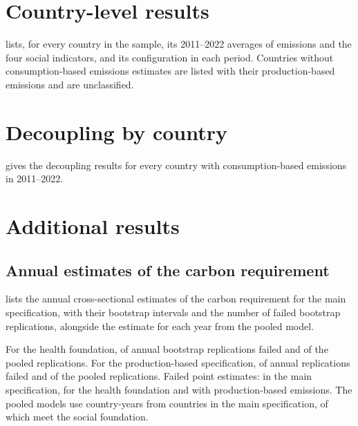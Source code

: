 \section{Country-level results}\label{app:countries}

 lists, for every country in the sample, its 2011--2022 averages of emissions and the four social indicators, and its configuration in each period. Countries without consumption-based emissions estimates are listed with their production-based emissions and are unclassified.



\section{Decoupling by country}\label{app:decoupling}

 gives the decoupling results for every country with consumption-based emissions in 2011--2022.



\section{Additional results}\label{app:extra}

\subsection{Annual estimates of the carbon requirement}

 lists the annual cross-sectional estimates of the carbon requirement for the main specification, with their bootstrap intervals and the number of failed bootstrap replications, alongside the estimate for each year from the pooled model.



For the health foundation, \nReqBootFailHealth{} of \nReqBootTotalHealth{} annual bootstrap replications failed and \nPooledBootFailHealth{} of the pooled replications. For the production-based specification, \nReqBootFailProd{} of \nReqBootTotalProd{} annual replications failed and \nPooledBootFailProd{} of the pooled replications. Failed point estimates: \nReqPointFailMain{} in the main specification, \nReqPointFailHealth{} for the health foundation and \nReqPointFailProd{} with production-based emissions. The pooled models use \nPooledNMain{} country-years from \nPooledCountriesMain{} countries in the main specification, of which \nPooledMetMain{} meet the social foundation.


